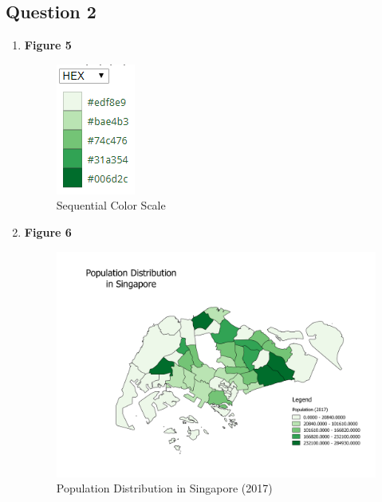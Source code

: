 \documentclass[a4paper, fleqn]{article}
\begin{document}
\subsection{Question 2}

\begin{enumerate}[label=(\alph{*})]
\item \textbf{Figure 5}\\
\begin{figure}[h!]
\begin{center}
\includegraphics{./assets/201802071807.png}
\caption{Sequential Color Scale}
\label{figure:image1}
\end{center}
\end{figure}
\pagebreak
\item \textbf{Figure 6}\\
\begin{figure}[h!]
\includegraphics[width=\linewidth]{./assets/201802071823.png}
\caption{Population Distribution in Singapore (2017)}
\label{figure:map5}
\end{figure}
\end{enumerate}
\end{document}
